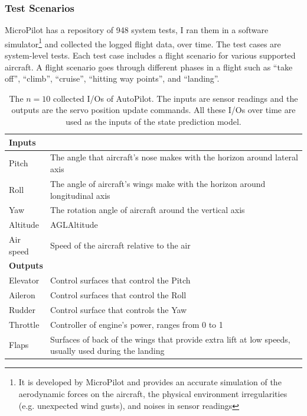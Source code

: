 \subsubsection{Test Scenarios}\label{sec:mp_test_scenarios}
MicroPilot has a repository of 948 system tests, I ran them in a software simulator\footnote{It is developed by MicroPilot and provides an accurate simulation of the aerodynamic forces on the aircraft, the physical environment irregularities (e.g. unexpected wind gusts), and noises in sensor readings} and collected the logged flight data, over time. 
The test cases are system-level tests. Each test case includes a flight scenario for various supported aircraft. A flight scenario goes through different phases in a flight such as ``take off'', ``climb'', ``cruise'', ``hitting way points'', and ``landing''.
\begin{table}
    \caption{The $n=10$ collected I/Os of AutoPilot. The inputs are sensor readings and the outputs are the servo position update commands. All these I/Os over time are used as the inputs of the state prediction model.}
    \label{tab:in_outs}
    \centering
\begin{tabularx}{\columnwidth}{lX}
                                                                                                                    \toprule
\multicolumn{2}{l}{\textbf{Inputs}}                                                                              \\ \midrule
Pitch     & The angle that aircraft's nose makes with the horizon around lateral axis                            \\ 
Roll      & The angle of aircraft's wings make with the horizon around longitudinal axis                         \\ 
Yaw       & The rotation angle of aircraft around the vertical axis                                              \\ 
Altitude  & AGL\footnotemark Altitude                                                                            \\ 
Air speed & Speed of the aircraft relative to the air                                                            \\ \midrule
\multicolumn{2}{l}{\textbf{Outputs}}                                                                             \\ \midrule
Elevator  & Control surfaces that control the Pitch                                                              \\ 
Aileron   & Control surfaces that control the Roll                                                               \\ 
Rudder    & Control surface that controls the Yaw                                                                \\ 
Throttle  & Controller of engine's power, ranges from 0 to 1                                                     \\ 
Flaps     & Surfaces of back of the wings that provide extra lift at low speeds, usually used during the landing \\ \bottomrule
\end{tabularx}
\end{table}
